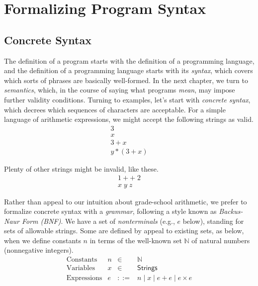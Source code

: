 \documentclass{amsbook}
\theoremstyle{definition}
\theoremstyle{remark}
\numberwithin{section}{chapter}
\numberwithin{equation}{chapter}
\begin{document}
\chapter{Formalizing Program Syntax}\label{syntax}

\section{Concrete Syntax}

The definition of a program starts with the definition of a programming language, and the definition of a programming language starts with its \emph{syntax}, which covers which sorts of phrases are basically well-formed.
In the next chapter, we turn to \emph{semantics}, which, in the course of saying what programs \emph{mean}, may impose further validity conditions.
Turning to examples, let's start with \emph{concrete syntax}, which decrees which sequences of characters are acceptable.
For a simple language of arithmetic expressions, we might accept the following strings as valid.
$$\begin{array}{l}
  3 \\
  x \\
  3 + x \\
  y * (3 + x)
\end{array}$$

Plenty of other strings might be invalid, like these.
$$\begin{array}{l}
  1 + + \; 2 \\
  x \; y \; z
\end{array}$$

Rather than appeal to our intuition about grade-school arithmetic, we prefer to formalize concrete syntax with a \emph{grammar}, following a style known as \emph{Backus-Naur Form (BNF)}.
We have a set of \emph{nonterminals} (e.g., $e$ below), standing for sets of allowable strings.
Some are defined by appeal to existing sets, as below, when we define constants $n$ in terms of the well-known set $\mathbb N$ of natural numbers (nonnegative integers).
\encoding
$$\begin{array}{rrcl}
  \textrm{Constants} & n &\in& \mathbb N \\
  \textrm{Variables} & x &\in& \mathsf{Strings} \\
  \textrm{Expressions} & e &::=& n \mid x \mid e + e \mid e \times e
\end{array}$$
\end{document}
